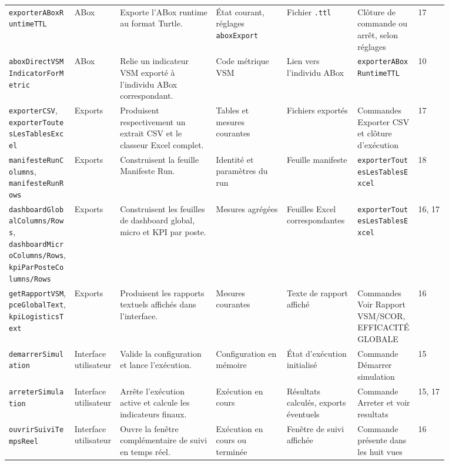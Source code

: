\begin{landscape}
{\begin{longtable}{L{0.13\linewidth} L{0.09\linewidth} L{0.19\linewidth} L{0.14\linewidth} L{0.14\linewidth} L{0.12\linewidth} L{0.06\linewidth}}
\texttt{exporter\allowbreak ABox\allowbreak Runtime\allowbreak TTL} & ABox & Exporte l'ABox runtime au format Turtle. & État courant, réglages \texttt{abox\allowbreak Export} & Fichier \texttt{.ttl} & Clôture de commande ou arrêt, selon réglages & 17 \\
\texttt{abox\allowbreak Direct\allowbreak VSMIndicator\allowbreak For\allowbreak Metric} & ABox & Relie un indicateur VSM exporté à l'individu ABox correspondant. & Code métrique VSM & Lien vers l'individu ABox & \texttt{exporter\allowbreak ABox\allowbreak Runtime\allowbreak TTL} & 10 \\

\texttt{exporter\allowbreak CSV}, \texttt{exporter\allowbreak Toutes\allowbreak Les\allowbreak Tables\allowbreak Excel} & Exports & Produisent respectivement un extrait CSV et le classeur Excel complet. & Tables et mesures courantes & Fichiers exportés & Commandes Exporter CSV et clôture d'exécution & 17 \\
\texttt{manifeste\allowbreak Run\allowbreak Columns}, \texttt{manifeste\allowbreak Run\allowbreak Rows} & Exports & Construisent la feuille Manifeste Run. & Identité et paramètres du run & Feuille manifeste & \texttt{exporter\allowbreak Toutes\allowbreak Les\allowbreak Tables\allowbreak Excel} & 18 \\
\texttt{dashboard\allowbreak Global\allowbreak Columns/Rows}, \texttt{dashboard\allowbreak Micro\allowbreak Columns/Rows}, \texttt{kpi\allowbreak Par\allowbreak Poste\allowbreak Columns/Rows} & Exports & Construisent les feuilles de dashboard global, micro et KPI par poste. & Mesures agrégées & Feuilles Excel correspondantes & \texttt{exporter\allowbreak Toutes\allowbreak Les\allowbreak Tables\allowbreak Excel} & 16, 17 \\
\texttt{get\allowbreak Rapport\allowbreak VSM}, \texttt{pce\allowbreak Global\allowbreak Text}, \texttt{kpi\allowbreak Logistics\allowbreak Text} & Exports & Produisent les rapports textuels affichés dans l'interface. & Mesures courantes & Texte de rapport affiché & Commandes Voir Rapport VSM/SCOR, EFFICACITÉ GLOBALE & 16 \\

\texttt{demarrer\allowbreak Simulation} & Interface utilisateur & Valide la configuration et lance l'exécution. & Configuration en mémoire & État d'exécution initialisé & Commande Démarrer simulation & 15 \\
\texttt{arreter\allowbreak Simulation} & Interface utilisateur & Arrête l'exécution active et calcule les indicateurs finaux. & Exécution en cours & Résultats calculés, exports éventuels & Commande Arreter et voir resultats & 15, 17 \\
\texttt{ouvrir\allowbreak Suivi\allowbreak Temps\allowbreak Reel} & Interface utilisateur & Ouvre la fenêtre complémentaire de suivi en temps réel. & Exécution en cours ou terminée & Fenêtre de suivi affichée & Commande présente dans les huit vues & 16 \\
\end{longtable}
}
\end{landscape}
